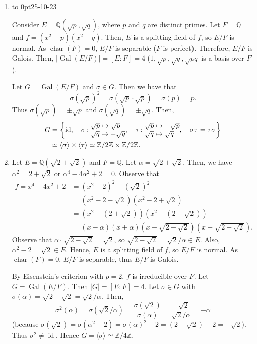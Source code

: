 \documentclass[twoside]{article}
\DeclareMathOperator\Char{char}
\DeclareMathOperator\Gal{Gal}
\DeclareMathOperator\id{id}
\newcommand\Z{\mathbb Z}
\newcommand\Q{\mathbb Q}
\theoremstyle{remark}
\newcommand*\newclass[1]{\par\vbox to 0pt{\hbox{\tiny\sffamily\color{gray}#1}} \par\ignorespaces}
\begin{document}
\begin{examples}
\begin{enumerate}[label=\arabic*.]
    \item \newclass{25-10-23}Consider \(E = \Q(\sqrt p, \sqrt q)\), where \(p\) and \(q\) are distinct primes. Let \(F = \Q\) and \(f = (x^2-p)(x^2-q)\). Then, \(E\) is a splitting field of \(f\), so \(E/F\) is normal. As \(\Char(F) = 0\), \(E/F\) is separable (\(F\) is perfect). Therefore, \(E/F\) is Galois. Then, \(\lvert\Gal(E/F)\vert = [E:F] = 4\) (\(1, \sqrt p, \sqrt q, \sqrt{pq}\) is a basis over \(F\)). \par
    Let \(G = \Gal(E/F)\) and \(\sigma \in G\). Then we have that
    \[\sigma(\sqrt p)^2 = \sigma(\sqrt p \cdot \sqrt p) = \sigma(p) = p. \]
    Thus \(\sigma(\sqrt p) = \pm \sqrt p\) and \(\sigma(\sqrt q) = \pm \sqrt q\). Then,
    \begin{align*}
      G & = \left\{ \id, \quad \sigma\colon \begin{array}{@{}l@{}} \sqrt p \mapsto \sqrt p \\ \sqrt q \mapsto -\sqrt q\end{array}, \quad \tau\colon \begin{array}{@{}l@{}} \sqrt p \mapsto - \sqrt p \\ \sqrt q \mapsto \sqrt q\end{array}, \quad \sigma\tau = \tau\sigma \right\} \\
      & \simeq \langle\sigma\rangle \times \langle\tau\rangle \simeq \Z/2\Z \times \Z/2\Z.
    \end{align*}
    
    \item Let \(E = \Q(\sqrt{2+\sqrt2})\) and \(F = \Q\). Let \(\alpha = \sqrt{2+\sqrt2}\). Then, we have \(\alpha^2 = 2 + \sqrt2\) or \(\alpha^4 - 4\alpha^2 + 2 = 0\). Observe that
    \begin{align*}
      f = x^4 - 4x^2 + 2 & = (x^2 - 2)^2 - (\sqrt 2)^2 \\
      & = (x^2 - 2 - \sqrt 2) (x^2 - 2 + \sqrt 2) \\
      & = (x^2 - (2 + \sqrt 2)) (x^2 - (2 - \sqrt 2)) \\
      & = (x-\alpha) (x+\alpha) \left( x-\sqrt{2-\sqrt2} \right) \left( x+\sqrt{2-\sqrt2} \right).
    \end{align*}
    Observe that \(\alpha \cdot \sqrt{2-\sqrt2} = \sqrt2\), so \(\sqrt{2-\sqrt2} = \sqrt2/\alpha \in E\). Also, \(\alpha^2 - 2 = \sqrt2 \in E\). Hence, \(E\) is a splitting field of \(f\), so \(E/F\) is normal. As \(\Char(F) = 0\), \(E/F\) is separable, thus \(E/F\) is Galois. \par
    By Eisenstein's criterion with \(p=2\), \(f\) is irreducible over \(F\). Let \(G = \Gal(E/F)\). Then \(|G| = [E:F] = 4\). Let \(\sigma \in G\) with \(\sigma(\alpha) = \sqrt{2-\sqrt2} = \sqrt2/\alpha\). Then,
    \[ \sigma^2(\alpha) = \sigma(\sqrt2/\alpha) = \frac{\sigma(\sqrt2)}{\sigma(\alpha)} = \frac{-\sqrt2}{\sqrt2/\alpha} = -\alpha \]
    (because \(\sigma(\sqrt2) = \sigma(\alpha^2-2) = \sigma(\alpha)^2-2 = (2-\sqrt2)-2 = -\sqrt2\)). Thus \(\sigma^2 \neq \id\). Hence \(G = \langle\sigma\rangle \simeq \Z/4\Z\).
    

\end{enumerate}
\end{examples}
\end{document}
